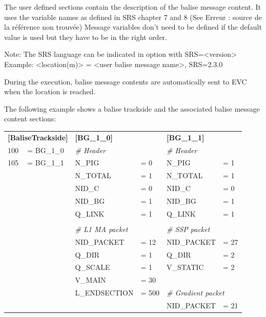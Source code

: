 \documentclass{template/openetcs}
\begin{document}
	The user defined sections contain the description of the balise message content. It uses the variable names as defined in SRS chapter 7 and 8 (See Erreur : source de la référence non trouvée) Message variables don’t need to be defined if the default value is used but they have to be in the right order.
	
	Note: The SRS language can be indicated in option with SRS=<version> Example: <location(m)> = <user balise message name>, SRS=2.3.0
	
	During the execution, balise message contents are automatically sent to EVC when the location is reached.
	
	The following example shows a balise trackside and the associated balise message content sections:
	
	\begin{tabular}{|l l l l l l|}
	
		\hline
		
		\multicolumn{2}{|l}{ \begin{minipage}[t]{0.33\linewidth} \textbf{[BaliseTrackside]} \end{minipage} } & \multicolumn{2}{l}{ \begin{minipage}[t]{0.33\linewidth} \textbf{[BG\_1\_0]} \end{minipage} } & \multicolumn{2}{l|}{ \begin{minipage}[t]{0.33\linewidth} \textbf{[BG\_1\_1]} \end{minipage} } \\ 
		100  &= BG\_1\_0 & \multicolumn{2}{l}{\emph{\# Header}} & \multicolumn{2}{l|}{\emph{\# Header}} \\ 
		105  &= BG\_1\_1 & N\_PIG &= 0 & N\_PIG &= 1 \\
		& & N\_TOTAL &= 1 & N\_TOTAL &= 1 \\
		& & NID\_C &= 0 & NID\_C &= 0 \\
		& & NID\_BG &= 1 & NID\_BG &= 1 \\
		& & Q\_LINK &= 1 & Q\_LINK &= 1 \\
		& & & & & \\
		& & \multicolumn{2}{l}{\emph{\# L1 MA packet}} & \multicolumn{2}{l|}{\emph{\# SSP packet}} \\ 
		& & NID\_PACKET &= 12 & NID\_PACKET &= 27 \\
		& & Q\_DIR &= 1 & Q\_DIR &= 2 \\
		& & Q\_SCALE &= 1 & V\_STATIC &= 2 \\
		& & V\_MAIN &= 30 & & \\
		& & L\_ENDSECTION &= 500 & \multicolumn{2}{l|}{\emph{\# Gradient packet}} \\ 
		& & & & NID\_PACKET &= 21 \\
		
		\hline
		
	\end{tabular}
	
\end{document}
